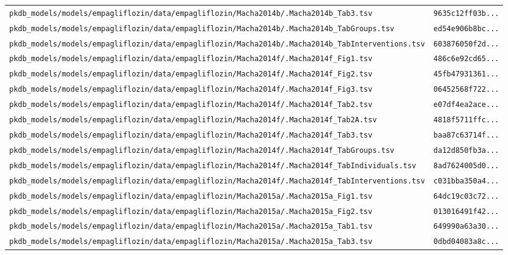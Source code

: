 \documentclass{article}
\begin{document}
\begin{longtable}{ll}
\texttt{pkdb\_models/models/empagliflozin/data/empagliflozin/Macha2014b/.Macha2014b\_Tab3.tsv} & \texttt{9635c12ff03b...} \\
\texttt{pkdb\_models/models/empagliflozin/data/empagliflozin/Macha2014b/.Macha2014b\_TabGroups.tsv} & \texttt{ed54e906b8bc...} \\
\texttt{pkdb\_models/models/empagliflozin/data/empagliflozin/Macha2014b/.Macha2014b\_TabInterventions.tsv} & \texttt{603876050f2d...} \\
\texttt{pkdb\_models/models/empagliflozin/data/empagliflozin/Macha2014f/.Macha2014f\_Fig1.tsv} & \texttt{486c6e92cd65...} \\
\texttt{pkdb\_models/models/empagliflozin/data/empagliflozin/Macha2014f/.Macha2014f\_Fig2.tsv} & \texttt{45fb47931361...} \\
\texttt{pkdb\_models/models/empagliflozin/data/empagliflozin/Macha2014f/.Macha2014f\_Fig3.tsv} & \texttt{06452568f722...} \\
\texttt{pkdb\_models/models/empagliflozin/data/empagliflozin/Macha2014f/.Macha2014f\_Tab2.tsv} & \texttt{e07df4ea2ace...} \\
\texttt{pkdb\_models/models/empagliflozin/data/empagliflozin/Macha2014f/.Macha2014f\_Tab2A.tsv} & \texttt{4818f5711ffc...} \\
\texttt{pkdb\_models/models/empagliflozin/data/empagliflozin/Macha2014f/.Macha2014f\_Tab3.tsv} & \texttt{baa87c63714f...} \\
\texttt{pkdb\_models/models/empagliflozin/data/empagliflozin/Macha2014f/.Macha2014f\_TabGroups.tsv} & \texttt{da12d850fb3a...} \\
\texttt{pkdb\_models/models/empagliflozin/data/empagliflozin/Macha2014f/.Macha2014f\_TabIndividuals.tsv} & \texttt{8ad7624005d0...} \\
\texttt{pkdb\_models/models/empagliflozin/data/empagliflozin/Macha2014f/.Macha2014f\_TabInterventions.tsv} & \texttt{c031bba350a4...} \\
\texttt{pkdb\_models/models/empagliflozin/data/empagliflozin/Macha2015a/.Macha2015a\_Fig1.tsv} & \texttt{64dc19c03c72...} \\
\texttt{pkdb\_models/models/empagliflozin/data/empagliflozin/Macha2015a/.Macha2015a\_Fig2.tsv} & \texttt{013016491f42...} \\
\texttt{pkdb\_models/models/empagliflozin/data/empagliflozin/Macha2015a/.Macha2015a\_Tab1.tsv} & \texttt{649990a63a30...} \\
\texttt{pkdb\_models/models/empagliflozin/data/empagliflozin/Macha2015a/.Macha2015a\_Tab3.tsv} & \texttt{0dbd04083a8c...} \\

\end{longtable}
\end{document}
